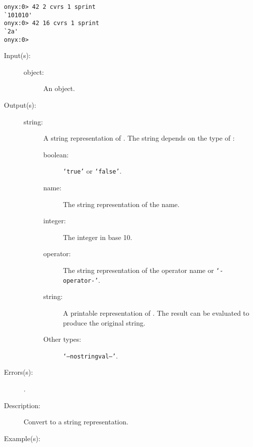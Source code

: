 \begin{description}
\begin{description}
\begin{verbatim}
onyx:0> 42 2 cvrs 1 sprint
`101010'
onyx:0> 42 16 cvrs 1 sprint
`2a'
onyx:0>
		\end{verbatim}
	\end{description}
\label{systemdict:cvs}
\item[{\onyxop{object}{cvs}{string}}: ]
	\begin{description}\item[]
	\item[Input(s): ]
		\begin{description}\item[]
		\item[object: ]
			An object.
		\end{description}
	\item[Output(s): ]
		\begin{description}\item[]
		\item[string: ]
			A string representation of .  The string
			depends on the type of :
			\begin{description}
			\item[boolean: ] {\tt `true'} or  {\tt `false'}.
			\item[name: ] The string representation of the name.
			\item[integer: ] The integer in base 10.
			\item[operator: ] The string representation of the
			operator name or {\tt `-operator-'}.
			\item[string: ] A printable representation of
			.  The result can be evaluated to produce
			the original string.
			\item[Other types: ] {\tt `--nostringval--'}.
			\end{description}
		\end{description}
	\item[Errors(s): ]
		\begin{description}\item[]
		\item[.]
		\end{description}
	\item[Description: ]
		Convert  to a string representation.
	\item[Example(s): ]\begin{verbatim}


\end{verbatim}
\end{description}
\end{description}

